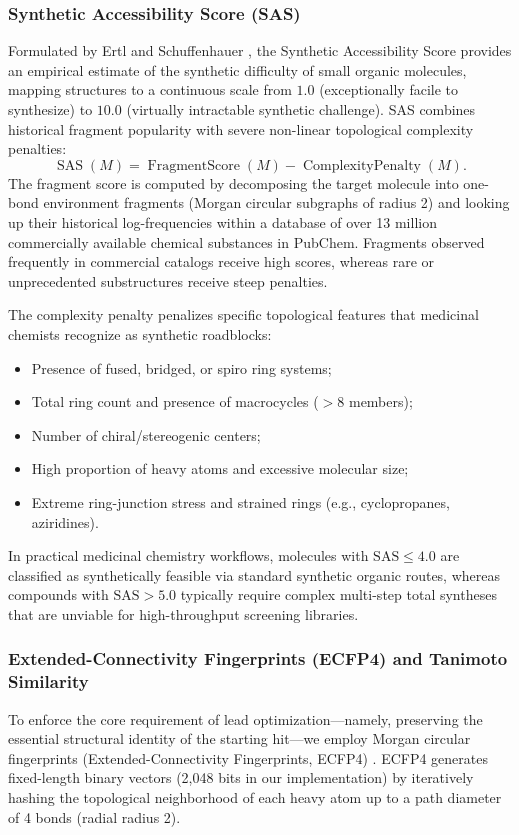 \documentclass{ieeeaccess}
\begin{document}
\subsubsection{Synthetic Accessibility Score (SAS)}
Formulated by Ertl and Schuffenhauer \cite{ertl2009}, the Synthetic Accessibility Score provides an empirical estimate of the synthetic difficulty of small organic molecules, mapping structures to a continuous scale from $1.0$ (exceptionally facile to synthesize) to $10.0$ (virtually intractable synthetic challenge). SAS combines historical fragment popularity with severe non-linear topological complexity penalties:
\begin{equation}
\operatorname{SAS}(M) = \operatorname{FragmentScore}(M) - \operatorname{ComplexityPenalty}(M).
\label{eq:sas_formula}
\end{equation}
The fragment score is computed by decomposing the target molecule into one-bond environment fragments (Morgan circular subgraphs of radius 2) and looking up their historical log-frequencies within a database of over 13 million commercially available chemical substances in PubChem. Fragments observed frequently in commercial catalogs receive high scores, whereas rare or unprecedented substructures receive steep penalties.

The complexity penalty penalizes specific topological features that medicinal chemists recognize as synthetic roadblocks:
\begin{itemize}
    \item Presence of fused, bridged, or spiro ring systems;
    \item Total ring count and presence of macrocycles ($>8$ members);
    \item Number of chiral/stereogenic centers;
    \item High proportion of heavy atoms and excessive molecular size;
    \item Extreme ring-junction stress and strained rings (e.g., cyclopropanes, aziridines).
\end{itemize}
In practical medicinal chemistry workflows, molecules with $\text{SAS} \le 4.0$ are classified as synthetically feasible via standard synthetic organic routes, whereas compounds with $\text{SAS} > 5.0$ typically require complex multi-step total syntheses that are unviable for high-throughput screening libraries.

\subsubsection{Extended-Connectivity Fingerprints (ECFP4) and Tanimoto Similarity}
To enforce the core requirement of lead optimization---namely, preserving the essential structural identity of the starting hit---we employ Morgan circular fingerprints (Extended-Connectivity Fingerprints, ECFP4) \cite{rogers2010}. ECFP4 generates fixed-length binary vectors (2,048 bits in our implementation) by iteratively hashing the topological neighborhood of each heavy atom up to a path diameter of 4 bonds (radial radius 2).
\end{document}
